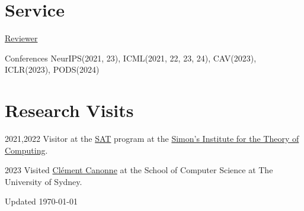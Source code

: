 \documentclass[12pt,letterpaper]{report}
\begin{document}
	
	
	\section*{Service}
	\underline{Reviewer }
	\begin{tablist}
		\item[Conferences] \tab NeurIPS(2021, 23), ICML(2021, 22, 23, 24), CAV(2023), ICLR(2023), PODS(2024)
	\end{tablist}
	
	\section*{Research Visits}
	\begin{tablist}
		\item[2021,2022]
		Visitor at the \href{https://simons.berkeley.edu/programs/sat2021}{SAT} program at the \href{https://simons.berkeley.edu/}{Simon's Institute for the Theory of Computing}.
		
		\item[2023]
		Visited  \href{https://ccanonne.github.io/}{Clément Canonne} at the School of Computer Science at The University of Sydney.
	\end{tablist}
	
	\begin{center}
		\vfill
		Updated \monthyeardate\today
	\end{center}
	
\end{document}
